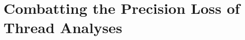 
\chapter{Combatting the Precision Loss of Thread Analyses}\label{chapter:precisionLossThreadAnalyses}

\parencite{schwarz2023clustered}
  
